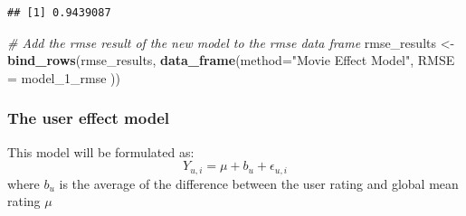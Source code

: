 \documentclass[]{article}
\newenvironment{Shaded}{\begin{snugshade}}{\end{snugshade}}
\newcommand{\KeywordTok}[1]{\textcolor[rgb]{0.13,0.29,0.53}{\textbf{#1}}}
\newcommand{\DataTypeTok}[1]{\textcolor[rgb]{0.13,0.29,0.53}{#1}}
\newcommand{\StringTok}[1]{\textcolor[rgb]{0.31,0.60,0.02}{#1}}
\newcommand{\CommentTok}[1]{\textcolor[rgb]{0.56,0.35,0.01}{\textit{#1}}}
\newcommand{\OperatorTok}[1]{\textcolor[rgb]{0.81,0.36,0.00}{\textbf{#1}}}
\newcommand{\NormalTok}[1]{#1}
\begin{document}
\begin{verbatim}
## [1] 0.9439087
\end{verbatim}

\begin{Shaded}
\begin{Highlighting}[]
\CommentTok{# Add the rmse result of the new model to the rmse data frame}
\NormalTok{rmse_results <-}\StringTok{ }\KeywordTok{bind_rows}\NormalTok{(rmse_results,}
                          \KeywordTok{data_frame}\NormalTok{(}\DataTypeTok{method=}\StringTok{"Movie Effect Model"}\NormalTok{,  }
                                     \DataTypeTok{RMSE =}\NormalTok{ model_1_rmse ))}
\end{Highlighting}
\end{Shaded}

\subsubsection{The user effect model}\label{the-user-effect-model}

This model will be formulated as:
\[ Y_{u,i} = \mu + b_u + \epsilon_{u,i} \] where \(b_u\) is the average
of the difference between the user rating and global mean rating \(\mu\)

\begin{Shaded}
\end{Shaded}
\end{document}
